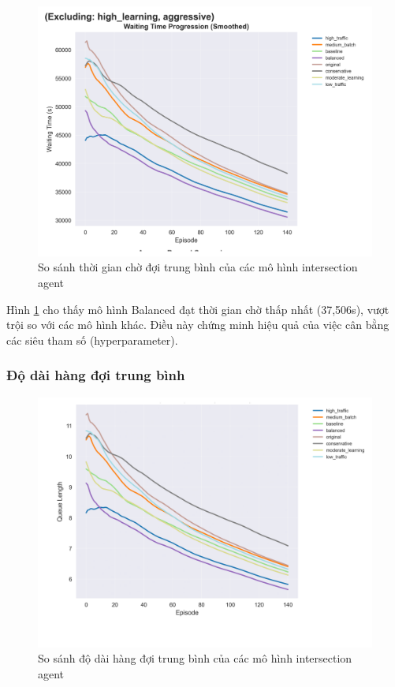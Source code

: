 \begin{figure}[!htp]
    \centering
    \includegraphics[width=\textwidth]{
        figures/individual_plots/intersection_filtered_waiting_time.png
    }
    \caption{So sánh thời gian chờ đợi trung bình của các mô hình intersection
    agent}
    \label{fig:intersection_filtered_waiting_time}
\end{figure}

Hình \ref{fig:intersection_filtered_waiting_time} cho thấy mô hình Balanced đạt thời
gian chờ thấp nhất (37,506s), vượt trội so với các mô hình khác. Điều này chứng minh
hiệu quả của việc cân bằng các siêu tham số (hyperparameter).

\subsubsection{Độ dài hàng đợi trung bình}

\begin{figure}[!htp]
    \centering
    \includegraphics[width=\textwidth]{
        figures/individual_plots/intersection_filtered_queue_length.png
    }
    \caption{So sánh độ dài hàng đợi trung bình của các mô hình intersection
    agent}
    \label{fig:intersection_filtered_queue_length}
\end{figure}

